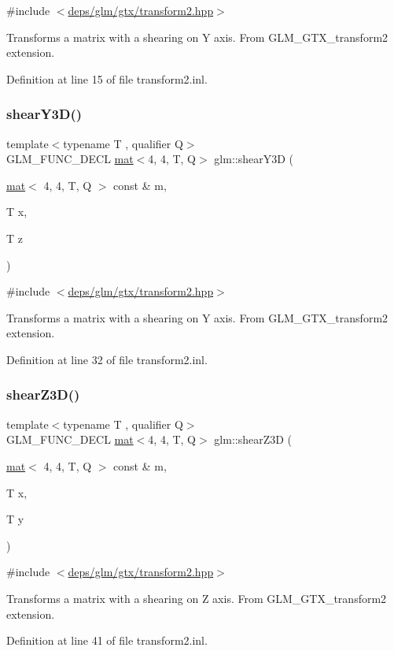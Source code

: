{\ttfamily \#include $<$\hyperlink{transform2_8hpp}{deps/glm/gtx/transform2.\+hpp}$>$}

Transforms a matrix with a shearing on Y axis. From G\+L\+M\+\_\+\+G\+T\+X\+\_\+transform2 extension. 

Definition at line 15 of file transform2.\+inl.

\mbox{\label{group__gtx__transform2_gade5bb65ffcb513973db1a1314fb5cfac}} 
\subsubsection{\texorpdfstring{shear\+Y3\+D()}{shearY3D()}}
{\footnotesize\ttfamily template$<$typename T , qualifier Q$>$ \\
G\+L\+M\+\_\+\+F\+U\+N\+C\+\_\+\+D\+E\+CL \hyperlink{structglm_1_1mat}{mat}$<$4, 4, T, Q$>$ glm\+::shear\+Y3D (\begin{DoxyParamCaption}\item[{\hyperlink{structglm_1_1mat}{mat}$<$ 4, 4, T, Q $>$ const \&}]{m,  }\item[{T}]{x,  }\item[{T}]{z }\end{DoxyParamCaption})}



{\ttfamily \#include $<$\hyperlink{transform2_8hpp}{deps/glm/gtx/transform2.\+hpp}$>$}

Transforms a matrix with a shearing on Y axis. From G\+L\+M\+\_\+\+G\+T\+X\+\_\+transform2 extension. 

Definition at line 32 of file transform2.\+inl.

\mbox{\label{group__gtx__transform2_ga6591e0a3a9d2c9c0b6577bb4dace0255}} 
\subsubsection{\texorpdfstring{shear\+Z3\+D()}{shearZ3D()}}
{\footnotesize\ttfamily template$<$typename T , qualifier Q$>$ \\
G\+L\+M\+\_\+\+F\+U\+N\+C\+\_\+\+D\+E\+CL \hyperlink{structglm_1_1mat}{mat}$<$4, 4, T, Q$>$ glm\+::shear\+Z3D (\begin{DoxyParamCaption}\item[{\hyperlink{structglm_1_1mat}{mat}$<$ 4, 4, T, Q $>$ const \&}]{m,  }\item[{T}]{x,  }\item[{T}]{y }\end{DoxyParamCaption})}



{\ttfamily \#include $<$\hyperlink{transform2_8hpp}{deps/glm/gtx/transform2.\+hpp}$>$}

Transforms a matrix with a shearing on Z axis. From G\+L\+M\+\_\+\+G\+T\+X\+\_\+transform2 extension. 

Definition at line 41 of file transform2.\+inl.

